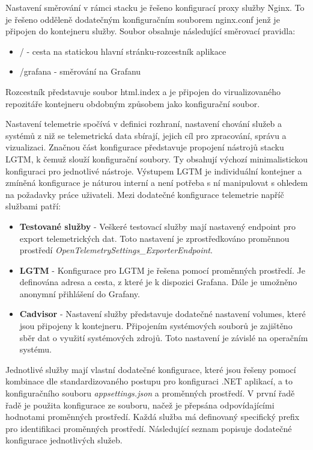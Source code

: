 Nastavení směrování v rámci stacku je řešeno konfigurací proxy služby Nginx. To je řešeno odděleně dodatečným konfiguračním souborem nginx.conf jenž je připojen do kontejneru služby. Soubor obsahuje následující směrovací pravidla:

\begin{itemize}
    \item / - cesta na statickou hlavní stránku-rozcestník aplikace
    \item /grafana - směrování na Grafanu
\end{itemize}

Rozcestník představuje soubor html.index a je připojen do virualizovaného repozitáře kontejneru obdobným způsobem jako konfigurační soubor. 


Nastavení telemetrie spočívá v definici rozhraní, nastavení chování služeb a systémů z niž se telemetrická data sbírají, jejich cíl pro zpracování, správu a vizualizaci. Značnou část konfigurace představuje propojení nástrojů stacku LGTM, k čemuž slouží konfigurační soubory. Ty obsahují výchozí minimalistickou konfiguraci pro jednotlivé nástroje. Výstupem LGTM je individuální kontejner a zmíněná konfigurace je náturou interní a není potřeba s ní manipulovat s ohledem na požadavky práce uživateli. Mezi dodatečné konfigurace telemetrie napříč službami patří:

\begin{itemize}
    \item \textbf{Testované služby} - Veškeré testovací služby mají nastavený endpoint pro export telemetrických dat. Toto nastavení je zprostředkováno proměnnou prostředí \emph{OpenTelemetrySettings\_ExporterEndpoint}.
    \item \textbf{LGTM} - Konfigurace pro LGTM je řešena pomocí proměnných prostředí. Je definována adresa a cesta, z které je k dispozici Grafana. Dále je umožněno anonymní přihlášení do Grafany.
    \item \textbf{Cadvisor} - Nastavení služby představuje dodatečné nastavení volumes, které jsou připojeny k kontejneru. Připojením systémových souborů je zajištěno sběr dat o využití systémových zdrojů. Toto nastavení je závislé na operačním systému.
\end{itemize}


Jednotlivé služby mají vlastní dodatečné konfigurace, které jsou řešeny pomocí kombinace dle standardizovaného postupu pro konfiguraci .NET aplikací, a to konfiguračního souboru \emph{appsettings.json} a proměnných prostředí. V první řadě řadě je použita konfigurace ze souboru, načež je přepsána odpovídajícími hodnotami proměnných prostředí. Každá služba má definovaný specifický prefix pro identifikaci proměnných prostředí. Následující seznam popisuje dodatečné konfigurace jednotlivých služeb.

